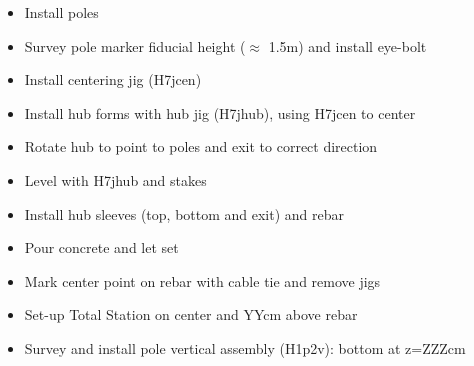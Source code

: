 \documentclass[11pt]{article}
\begin{document}
\renewcommand{\labelitemi}{$\boxempty$}
\begin{itemize}
\item Install poles
\item Survey pole marker fiducial height ($\approx$ 1.5m) and install eye-bolt
\item Install centering jig (H7jcen)
\item Install hub forms with hub jig (H7jhub), using H7jcen to center
\item Rotate hub to point to poles and exit to correct direction
\item Level with H7jhub and stakes
\item Install hub sleeves (top, bottom and exit) and rebar
\item Pour concrete and let set
\item Mark center point on rebar with cable tie and remove jigs
\item Set-up Total Station on center and YYcm above rebar
\item Survey and install pole vertical assembly (H1p2v):  bottom at z=ZZZcm

\end{itemize}



\end{document}
